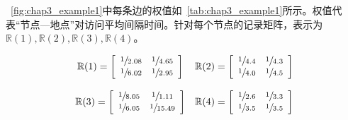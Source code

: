 \figurename~\ref{fig:chap3_example1}中每条边的权值如\tablename~\ref{tab:chap3_example1}所示。权值代表“节点—地点”对访问平均间隔时间。针对每个节点的记录矩阵，表示为$\mathbb{R}(1),\mathbb{R}(2),\mathbb{R}(3),\mathbb{R}(4)$。

\[
\begin{array}{cc}
\mathbb{R}(1)=\left[
\begin{array}{cc}
\sfrac{1}{2.08} & \sfrac{1}{4.65} \\
\sfrac{1}{6.02} & \sfrac{1}{2.95}
\end{array}\right]&
\mathbb{R}(2)=\left[
\begin{array}{cc}
\sfrac{1}{4.4} & \sfrac{1}{4.3} \\
\sfrac{1}{4.0} & \sfrac{1}{4.5}
\end{array}\right]    \\ \\
\mathbb{R}(3)=\left[
\begin{array}{cc}
\sfrac{1}{8.05} & \sfrac{1}{1.11} \\
\sfrac{1}{6.05} & \sfrac{1}{15.49}
\end{array}\right]
&
\mathbb{R}(4)=\left[
\begin{array}{cc}
\sfrac{1}{2.6} & \sfrac{1}{3.3} \\
\sfrac{1}{3.5} & \sfrac{1}{3.5}
\end{array}\right]
\end{array}
\]

